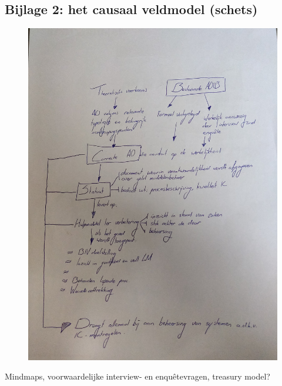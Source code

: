 \documentclass[10pt,a4paper,oneside]{report}
\begin{document}
\subsection*{\hypertarget{bij:veldmodel}{Bijlage 2}: het causaal veldmodel \color{red}(schets)\color{black}}
\begin{figure}[ht]
    \centering
    \includegraphics[angle=-90,scale=0.10]{veldmodel}
    \label{fig:veldmodel}
\end{figure}

\color{red}
\noindent
Mindmaps, voorwaardelijke interview- en enquêtevragen, treasury model?
\end{document}
